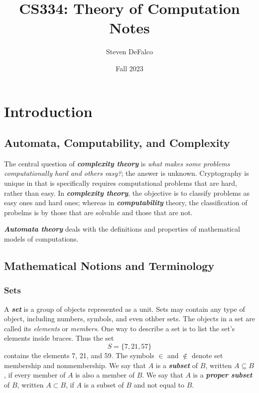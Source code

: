 \documentclass{article}
\title{CS334: Theory of Computation Notes}
\author{Steven DeFalco}
\date{Fall 2023}
\theoremstyle{definition}
\newcommand{\define}[1]{\textbf{\textit{#1}}}
\begin{document}
\maketitle
\tableofcontents
\newpage



\section{Introduction}

\subsection{Automata, Computability, and Complexity}

The central question of \define{complexity theory} is \emph{what makes some problems computationally hard and others easy?}; the answer is unknown. Cryptography is unique in that is specifically requires computational problems that are hard, rather than easy. 
In \define{complexity theory}, the objective is to classify problems as easy ones and hard ones; whereas in \define{computability} theory, the classification of probelms is by those that are solvable and those that are not. 

\define{Automata theory} deals with the definitions and properties of mathematical models of computations. 

\subsection{Mathematical Notions and Terminology}

\subsubsection{Sets} 

A \define{set} is a group of objects represented as a unit. Sets may contain any type of object, including numbers, symbols, and even othber sets. The objects in a set are called its \emph{elements} or \emph{members}. One way to describe a set is to list the set's elements inside braces. Thus the set  $$S = \{7,21,57\}$$ contains the elements 7, 21, and 59. The symbols $\in$ and $\notin$ denote set membership and nonmembership. We say that $A$ is a \define{subset} of $B$, written $A \subseteq B$, if every member of $A$ is also a member of $B$. We say that $A$ is a \define{proper subset} of $B$, written $A \subset B$, if $A$ is a subset of $B$ and not equal to $B$. \\ 
\end{document}
